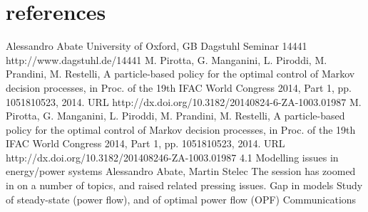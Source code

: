 \documentclass[11pt]{article}
\begin{document}
\section{references}
Alessandro Abate University of Oxford, GB Dagstuhl Seminar 14441 http://www.dagstuhl.de/14441 M. Pirotta, G. Manganini, L. Piroddi, M. Prandini, M. Restelli, A particle-based policy for the optimal control of Markov decision processes, in Proc. of the 19th IFAC World Congress 2014, Part 1, pp. 1051810523, 2014. URL http://dx.doi.org/10.3182/20140824-6-ZA-1003.01987 M. Pirotta, G. Manganini, L. Piroddi, M. Prandini, M. Restelli, A particle-based policy for the optimal control of Markov decision processes, in Proc. of the 19th IFAC World Congress 2014, Part 1, pp. 1051810523, 2014. URL http://dx.doi.org/10.3182/201408246-ZA-1003.01987 4.1 Modelling issues in energy/power systems Alessandro Abate, Martin Stelec The session has zoomed in on a number of topics, and raised related pressing issues. Gap in models Study of steady-state (power ﬂow), and of optimal power ﬂow (OPF) Communications
\end{document}
